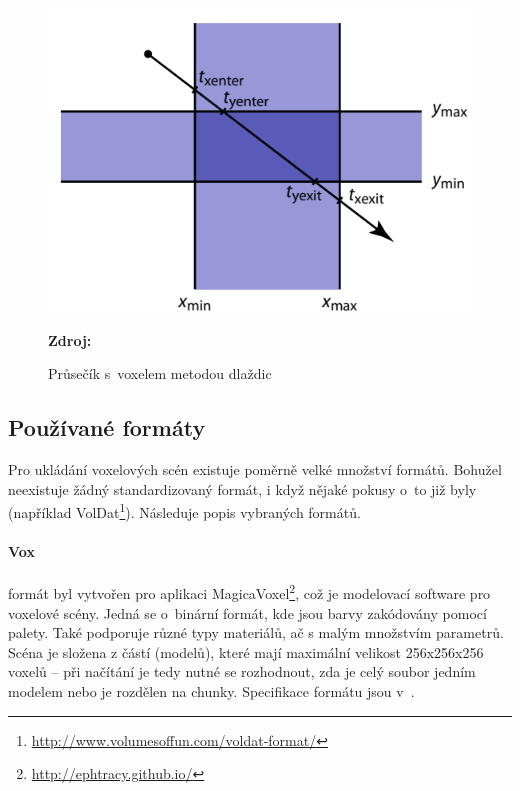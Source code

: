 \begin{figure}[H]
	\centering
	\includegraphics[scale=1.3]{obrazky-figures/slab_intersect.png}
	\caption{Průsečík s~voxelem metodou dlaždic}
	\textbf{Zdroj: \cite{Cunha13}}
	\label{fig:slabs}
\end{figure}


\subsection{Používané formáty} \label{sec:format}
Pro ukládání voxelových scén existuje poměrně velké množství formátů. Bohužel neexistuje žádný standardizovaný formát, i když nějaké pokusy o~to již byly (například VolDat\footnote{\url{http://www.volumesoffun.com/voldat-format/}}). Následuje popis vybraných formátů.

\paragraph{Vox} formát byl vytvořen pro aplikaci MagicaVoxel\footnote{\url{http://ephtracy.github.io/}}, což je modelovací software pro voxelové scény. Jedná se o~binární formát, kde jsou barvy zakódovány pomocí palety. Také podporuje různé typy materiálů, ač s malým množstvím parametrů. Scéna je složena z částí (modelů), které mají maximální velikost 256x256x256 voxelů -- při načítání je tedy nutné se rozhodnout, zda je celý soubor jedním modelem nebo je rozdělen na chunky. Specifikace formátu jsou v~\cite{vox_format}.

